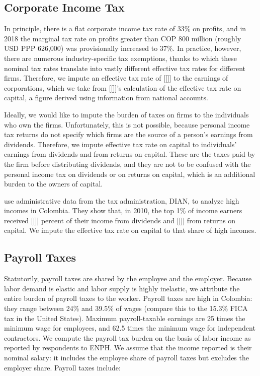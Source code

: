 \documentclass[12pt]{article}
\begin{document}
\begin{appendices}
\subsection{Corporate Income Tax}

In principle, there is a flat corporate income tax rate of 33\% on profits,
and in 2018 the marginal tax rate
on profits greater than COP 800 million (roughly USD PPP 626,000)
was provisionally increased to 37\%.
In practice, however, there are numerous industry-specific tax exemptions,
thanks to which these nominal tax rates translate into
vastly different effective tax rates for different firms.
Therefore, we impute an effective tax rate of [[]]
to the earnings of corporations,
which we take from [[]]'s calculation of the effective tax rate on capital,
a figure derived using information from national accounts.

Ideally, we would like to impute the burden of taxes on firms
to the individuals who own the firms.
Unfortunately, this is not possible,
because personal income tax returns do not specify
which firms are the source of a person's earnings from dividends.
Therefore, we impute effective tax rate on capital
to individuals' earnings from dividends and from returns on capital.
These are the taxes paid by the firm before distributing dividends,
and they are not to be confused with
the personal income tax on dividends or on returns on capital,
which is an additional burden to the owners of capital.

\citet{juliana} use administrative data from the tax administration, DIAN,
to analyze high incomes in Colombia.
They show that, in 2010, the top 1\% of income earners
received [[]] percent of their income from dividends
and [[]] from returns on capital.
We impute the effective tax rate on capital to that share of high incomes.

\subsection{Payroll Taxes}

Statutorily, payroll taxes are shared by the employee and the employer.
Because labor demand is elastic and labor supply is highly inelastic,
we attribute the entire burden of payroll taxes to the worker.
Payroll taxes are high in Colombia:
they range between 24\% and 39.5\% of wages
(compare this to the 15.3\% FICA tax in the United States).
Maximum payroll-taxable earnings are 25 times the minimum wage for employees,
and 62.5 times the minimum wage for independent contractors.
We compute the payroll tax burden on the basis of
labor income as reported by respondents to ENPH.
We assume that the income reported is their nominal salary:
it includes the employee share of payroll taxes
but excludes the employer share.
Payroll taxes include:
\begin{itemize}


\end{itemize}
\end{appendices}
\end{document}

